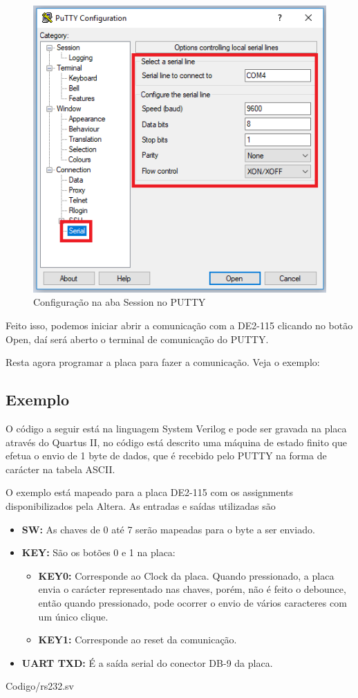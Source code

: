 \documentclass[12pt,a4paper]{article} %
\begin{document}
\begin{figure}[!htb]
\centering
	\includegraphics[scale=0.6]{imagens/config2}
	\caption{Configuração na aba Session no PUTTY}
	\label{config2}
\end{figure}
Feito isso, podemos iniciar abrir a comunicação com a DE2-115 clicando 
no botão Open, daí será aberto o terminal de comunicação do PUTTY.

Resta agora programar a placa para fazer a comunicação. Veja o exemplo:

\subsection*{Exemplo}

O código a seguir está na linguagem System Verilog e pode ser gravada na 
placa através do Quartus II, no código está descrito uma máquina de 
estado finito que efetua o envio de 1 byte de dados, que é recebido pelo 
PUTTY na forma de carácter na tabela ASCII.

O exemplo está mapeado para a placa DE2-115 com os assignments 
disponibilizados pela Altera. As entradas e saídas utilizadas são 
\cite{Baker}
\begin{itemize}
	\item \textbf{SW:} As chaves de 0 até 7 serão mapeadas para o 
byte a ser enviado.
	\item \textbf{KEY:} São os botões 0 e 1 na placa:
	\begin{itemize}
		\item \textbf{KEY0:} Corresponde ao Clock da placa. 
Quando pressionado, a placa envia o carácter representado nas chaves, 
porém, não é feito o debounce, então quando pressionado, pode ocorrer o 
envio de vários caracteres com um único clique.
		\item \textbf{KEY1:} Corresponde ao reset da 
comunicação.
	\end{itemize}
	\item \textbf{UART TXD:} É a saída serial do conector DB-9 da 
placa.
\end{itemize}
{Codigo/rs232.sv}
\pagebreak


\end{document}
